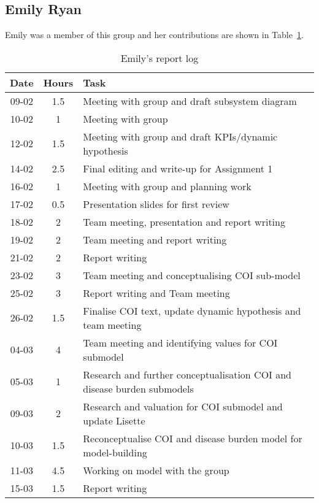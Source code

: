 
\subsection{Emily Ryan}
Emily was a member of this group and her contributions are shown in Table~\ref{tab:emily_log}. 
\begin{longtable}[c]{c|c|m{35em}}
\caption{Emily's report log}
\label{tab:emily_log}\\
\textbf{Date}& \textbf{Hours} & \textbf{Task} \\
\hline
\endfirsthead
%
\endhead
%
 09-02  &   1.5    & Meeting with group and draft subsystem diagram  \\
 10-02  &    1   & Meeting with group  \\
 12-02  &    1.5   & Meeting with group and draft KPIs/dynamic hypothesis  \\
 14-02  & 2.5  & Final editing and write-up for Assignment 1\\
 16-02 & 1 & Meeting with group and planning work\\
 17-02 & 0.5 & Presentation slides for first review\\
 18-02 & 2 & Team meeting, presentation and report writing\\
 19-02 & 2 & Team meeting and report writing\\
 21-02 & 2 & Report writing\\
 23-02 & 3 & Team meeting and conceptualising COI sub-model\\
 25-02 & 3 & Report writing and Team meeting\\
 26-02 & 1.5 & Finalise COI text, update dynamic hypothesis and team meeting\\
 04-03 & 4 & Team meeting and identifying values for COI submodel\\
 05-03 & 1 & Research and further conceptualisation COI and disease burden submodels\\
 09-03 & 2 & Research and valuation for COI submodel and update Lisette\\
 10-03 & 1.5 & Reconceptualise COI and disease burden model for model-building \\
 11-03 &  4.5 & Working on model with the group \\
 15-03 & 1.5 & Report writing \\

\end{longtable}
